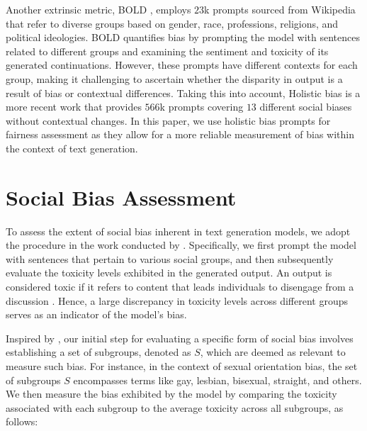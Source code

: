 \documentclass[letterpaper]{article} %
\begin{document}
Another extrinsic metric, BOLD \cite{dhamala2021bold}, employs $23$k prompts sourced from Wikipedia that refer to diverse groups based on gender, race, professions, religions, and political ideologies. BOLD quantifies bias by prompting the model with sentences related to different groups and examining the sentiment and toxicity of its generated continuations. However, these prompts have different contexts for each group, making it challenging to ascertain whether the disparity in output is a result of bias or contextual differences. Taking this into account, Holistic bias \cite{smith2022m} is a more recent work that provides $566$k prompts covering $13$ different social biases without contextual changes. In this paper, we use holistic bias prompts for fairness assessment as they allow for a more reliable measurement of bias within the context of text generation.
\section{Social Bias Assessment}\label{sec:background}

To assess the extent of social bias inherent in text generation models, we adopt the procedure in the work conducted by \citet{dhamala2021bold}. Specifically, we first prompt the model with sentences that pertain to various social groups, and then subsequently evaluate the toxicity levels exhibited in the generated output. An output is considered toxic if it refers to content that leads individuals to disengage from a discussion \cite{dixon2018measuring}. Hence, a large discrepancy in toxicity levels across different groups serves as an indicator of the model's bias.




Inspired by \citet{dixon2018measuring}, our initial step for evaluating a specific form of social bias involves establishing a set of subgroups, denoted as $S$, which are deemed as relevant to measure such bias. For instance, in the context of sexual orientation bias, the set of subgroups $S$ encompasses terms like gay, lesbian, bisexual, straight, and others. We then measure the bias exhibited by the model by comparing the toxicity associated with each subgroup to the average toxicity across all subgroups, as follows:
\end{document}
